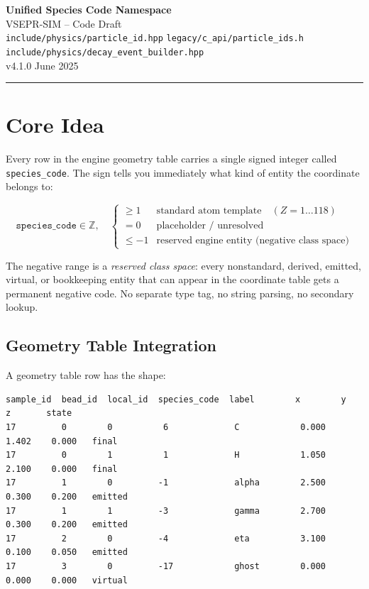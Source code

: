 \documentclass[11pt,a4paper]{article}
\begin{document}
\begin{center}
  {\LARGE\bfseries Unified Species Code Namespace}\\[4pt]
  {\large VSEPR-SIM -- Code Draft}\\[2pt]
  {\small\texttt{include/physics/particle\_id.hpp} \quad
          \texttt{legacy/c\_api/particle\_ids.h} \quad
          \texttt{include/physics/decay\_event\_builder.hpp}}\\[6pt]
  {\small v4.1.0 \quad June 2025}
\end{center}

\vspace{4pt}\hrule\vspace{8pt}
\tableofcontents
\newpage

\section{Core Idea}

Every row in the engine geometry table carries a single signed integer
called \texttt{species\_code}.  The sign tells you immediately what
kind of entity the coordinate belongs to:

\[
\texttt{species\_code} \in \mathbb{Z},\quad
\begin{cases}
\geq 1  & \text{standard atom template} \quad (Z = 1\ldots 118) \\
= 0     & \text{placeholder / unresolved} \\
\leq -1 & \text{reserved engine entity (negative class space)}
\end{cases}
\]

The negative range is a \emph{reserved class space}: every nonstandard,
derived, emitted, virtual, or bookkeeping entity that can appear in the
coordinate table gets a permanent negative code.  No separate type tag,
no string parsing, no secondary lookup.

\subsection{Geometry Table Integration}

A geometry table row has the shape:

\begin{lstlisting}[style=tbl,
  caption={Long-form geometry table with species\_code column}]
sample_id  bead_id  local_id  species_code  label        x        y        z       state
17         0        0          6             C            0.000    1.402    0.000   final
17         0        1          1             H            1.050    2.100    0.000   final
17         1        0         -1             alpha        2.500    0.300    0.200   emitted
17         1        1         -3             gamma        2.700    0.300    0.200   emitted
17         2        0         -4             eta          3.100    0.100    0.050   emitted
17         3        0         -17            ghost        0.000    0.000    0.000   virtual
\end{lstlisting}
\end{document}
